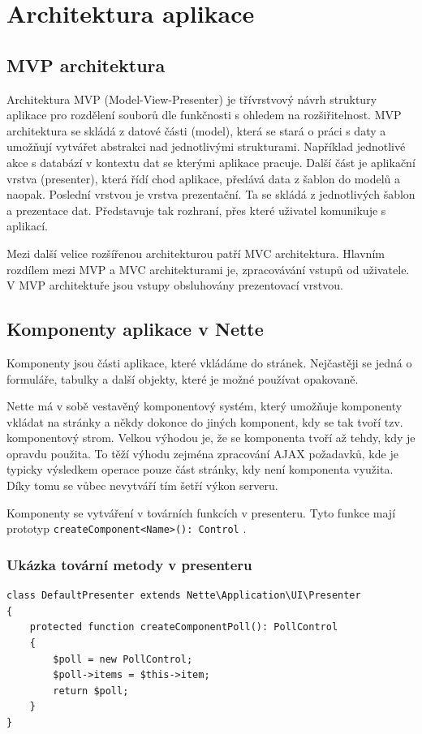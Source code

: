 \documentclass[czech,BP]{thesiskiv}
\begin{document}
	\section{Architektura aplikace}
		\subsection{MVP architektura}
		\par Architektura MVP (Model-View-Presenter) je třívrstvový návrh struktury aplikace pro rozdělení souborů dle funkčnosti s ohledem na rozšiřitelnost. MVP architektura se skládá z datové části (model), která se stará o práci s daty a umožňují vytvářet abstrakci nad jednotlivými strukturami. Například jednotlivé akce s databází v kontextu dat se kterými aplikace pracuje. Další část je aplikační vrstva (presenter), která řídí chod aplikace, předává data z šablon do modelů a naopak. Poslední vrstvou je vrstva prezentační. Ta se skládá z jednotlivých šablon a prezentace dat. Představuje tak rozhraní, přes které uživatel komunikuje s aplikací.
		\par Mezi další velice rozšířenou architekturou patří MVC architektura. Hlavním rozdílem mezi MVP a MVC architekturami je, zpracovávání vstupů od uživatele. V MVP architektuře jsou vstupy obsluhovány prezentovací vrstvou.
		\subsection{Komponenty aplikace v Nette}
		\par Komponenty jsou části aplikace, které vkládáme do stránek. Nejčastěji se jedná o formuláře, tabulky a další objekty, které je možné používat opakovaně.
		\par Nette má v sobě vestavěný komponentový systém, který umožňuje komponenty vkládat na stránky a někdy dokonce do jiných komponent, kdy se tak tvoří tzv. komponentový strom. Velkou výhodou je, že se komponenta tvoří až tehdy, kdy je opravdu použita. To těží výhodu zejména zpracování AJAX požadavků, kde je typicky výsledkem operace pouze část stránky, kdy není komponenta využita. Díky tomu se vůbec nevytváří tím šetří výkon serveru.
		\par Komponenty se vytváření v továrních funkcích v presenteru. Tyto funkce mají prototyp \texttt{createComponent<Name>(): Control} \cite{NetteComponents}.
		
		\subsubsection{Ukázka tovární metody v presenteru}
		\begin{lstlisting}[caption={Ukázka tovární metody v presenteru}]
class DefaultPresenter extends Nette\Application\UI\Presenter
{
	protected function createComponentPoll(): PollControl
	{
		$poll = new PollControl;
		$poll->items = $this->item;
		return $poll;
	}
}
		\end{lstlisting}
		 
\end{document}
